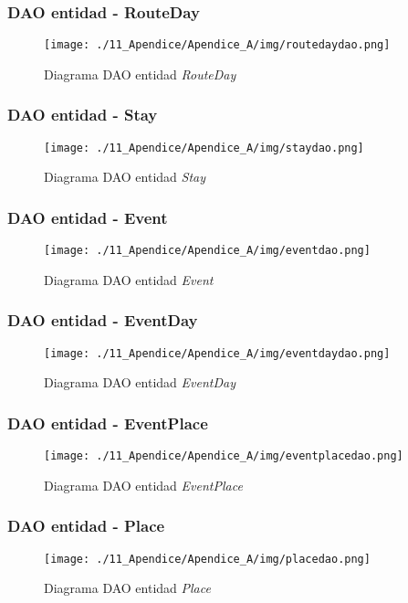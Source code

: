 \subsubsection*{DAO entidad - RouteDay}
\begin{figure}[H]
\centering
\texttt{[image: ./11\_Apendice/Apendice\_A/img/routedaydao.png]}
\caption{Diagrama DAO entidad \textit{RouteDay}}
\end{figure}



\subsubsection*{DAO entidad - Stay}
\begin{figure}[H]
\centering
\texttt{[image: ./11\_Apendice/Apendice\_A/img/staydao.png]}
\caption{Diagrama DAO entidad \textit{Stay}}
\end{figure}



\subsubsection*{DAO entidad - Event}
\begin{figure}[H]
\centering
\texttt{[image: ./11\_Apendice/Apendice\_A/img/eventdao.png]}
\caption{Diagrama DAO entidad \textit{Event}}
\end{figure}



\subsubsection*{DAO entidad - EventDay}
\begin{figure}[H]
\centering
\texttt{[image: ./11\_Apendice/Apendice\_A/img/eventdaydao.png]}
\caption{Diagrama DAO entidad \textit{EventDay}}
\end{figure}



\subsubsection*{DAO entidad - EventPlace}
\begin{figure}[H]
\centering
\texttt{[image: ./11\_Apendice/Apendice\_A/img/eventplacedao.png]}
\caption{Diagrama DAO entidad \textit{EventPlace}}
\end{figure}



\subsubsection*{DAO entidad - Place}
\begin{figure}[H]
\centering
\texttt{[image: ./11\_Apendice/Apendice\_A/img/placedao.png]}
\caption{Diagrama DAO entidad \textit{Place}}
\end{figure}